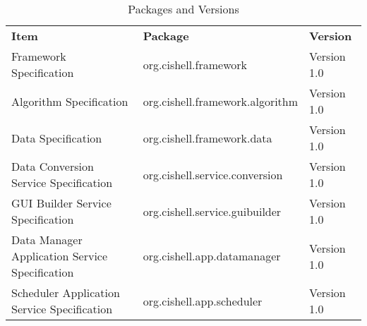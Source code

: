 \begin{table}[h!]
\begin{tabular}{l l l}
\textbf{Item} & \textbf{Package} & \textbf{Version} \\
Framework Specification & org.cishell.framework & Version 1.0 \\
Algorithm Specification & org.cishell.framework.algorithm & Version 1.0 \\
Data Specification & org.cishell.framework.data & Version 1.0 \\
Data Conversion Service Specification & org.cishell.service.conversion &
Version 1.0 \\
GUI Builder Service Specification & org.cishell.service.guibuilder & Version
1.0 \\
Data Manager Application Service Specification & org.cishell.app.datamanager &
Version 1.0 \\
Scheduler Application Service Specification & org.cishell.app.scheduler &
Version 1.0 \\
\end{tabular}
\caption{Packages and Versions}
\label{table:packageVersions}
\end{table}